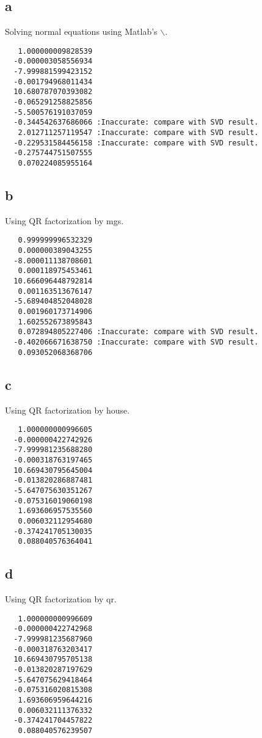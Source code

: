 \documentclass[10pt]{amsart}
\theoremstyle{remark}
\begin{document}
\subsection{a} Solving normal equations using Matlab's $\backslash$.

\begin{verbatim}
   1.000000009828539
  -0.000003058556934
  -7.999881599423152
  -0.001794968011434
  10.680787070393082
  -0.065291258825856
  -5.500576191037059
  -0.344542637686066 :Inaccurate: compare with SVD result.
   2.012711257119547 :Inaccurate: compare with SVD result.
  -0.229531584456158 :Inaccurate: compare with SVD result.
  -0.275744751507555
   0.070224085955164
\end{verbatim}


\subsection{b} Using QR factorization by mgs.
\begin{verbatim}
   0.999999996532329
   0.000000389043255
  -8.000011138708601
   0.000118975453461
  10.666096448792814
   0.001163513676147
  -5.689404852048028
   0.001960173714906
   1.602552673895843
   0.072894805227406 :Inaccurate: compare with SVD result.
  -0.402066671638750 :Inaccurate: compare with SVD result.
   0.093052068368706
\end{verbatim}

\subsection{c} Using QR factorization by house.
\begin{verbatim}
   1.000000000996605
  -0.000000422742926
  -7.999981235688280
  -0.000318763197465
  10.669430795645004
  -0.013820286887481
  -5.647075630351267
  -0.075316019060198
   1.693606957535560
   0.006032112954680
  -0.374241705130035
   0.088040576364041
\end{verbatim}

\subsection{d} Using QR factorization by qr.
\begin{verbatim}
   1.000000000996609
  -0.000000422742968
  -7.999981235687960
  -0.000318763203417
  10.669430795705138
  -0.013820287197629
  -5.647075629418464
  -0.075316020815308
   1.693606959644216
   0.006032111376332
  -0.374241704457822
   0.088040576239507
\end{verbatim}
\end{document}
